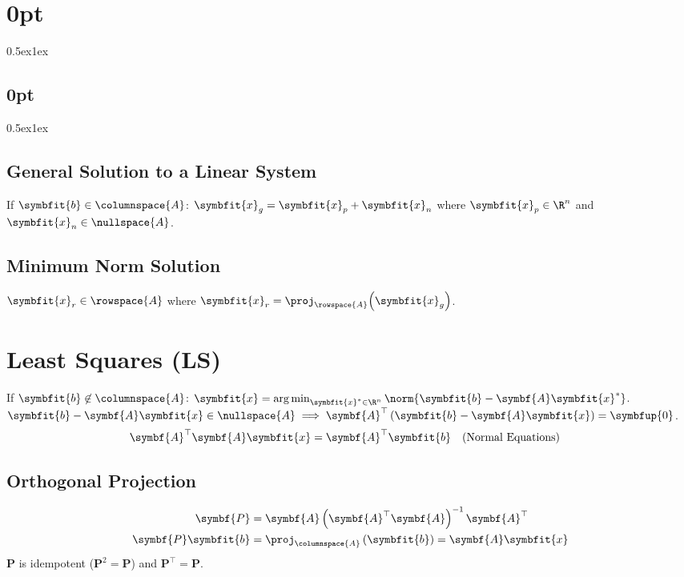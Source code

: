 \documentclass{article}
\DeclareMathOperator*{\argmin}{arg\,min}
\begin{document}
\titlespacing*\section{0pt}{0.5ex}{1ex}
\titlespacing*\subsection{0pt}{0.5ex}{1ex}
%
\setlength\abovecaptionskip{8pt}
\setlength\belowcaptionskip{-15pt}
\setlength\textfloatsep{0pt}
%
\setlength\abovedisplayskip{1pt}
\setlength\belowdisplayskip{1pt}

\begin{multicols*}{3}
    \subsection{General Solution to a Linear System}
    If \(\symbfit{b} \in \columnspace{A}\): \(\symbfit{x}_g = \symbfit{x}_p + \symbfit{x}_n\)
    where \(\symbfit{x}_p \in \R^n\) and \(\symbfit{x}_n \in \nullspace{A}\).
    \subsection{Minimum Norm Solution}
    \(\symbfit{x}_r \in \rowspace{A}\) where \(\symbfit{x}_r = \proj_{\rowspace{A}}{\left( \symbfit{x}_g \right)}\).
    \section{Least Squares (LS)}
    If \(\symbfit{b} \not\in \columnspace{A}\): \(\symbfit{x} = \argmin_{\symbfit{x}^\ast \in \R^n} \norm{\symbfit{b} - \symbf{A}\symbfit{x}^\ast}\).
    \(\symbfit{b} - \symbf{A} \symbfit{x} \in \nullspace{A} \implies \symbf{A}^\top \left( \symbfit{b} - \symbf{A}\symbfit{x} \right) = \symbfup{0}\).
    \begin{align*}
        \symbf{A}^\top \symbf{A}\symbfit{x} & = \symbf{A}^\top \symbfit{b} &  & \text{(Normal Equations)}
    \end{align*}
    \subsection{Orthogonal Projection}
    \begin{align*}
        \symbf{P}             & = \symbf{A} \left( \symbf{A}^\top \symbf{A} \right)^{-1} \symbf{A}^\top     \\
        \symbf{P} \symbfit{b} & = \proj_{\columnspace{A}} \left( \symbfit{b} \right) = \symbf{A}\symbfit{x}
    \end{align*}
    \(\symbf{P}\) is idempotent (\(\symbf{P}^2 = \symbf{P}\)) and \(\symbf{P}^\top = \symbf{P}\).

\end{multicols*}
\end{document}
